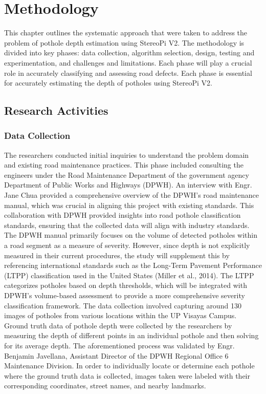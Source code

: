 \chapter{Methodology}
This chapter outlines the systematic approach that were taken to address the problem of pothole depth estimation using StereoPi V2. The methodology is divided into key phases: data collection, algorithm selection, design, testing and experimentation, and challenges and limitations. Each phase will play a crucial role in accurately classifying and assessing road defects.  Each phase is essential for accurately estimating the depth of potholes using StereoPi V2. 

\section{ Research Activities}

\subsection{Data Collection}
The researchers conducted initial inquiries to understand the problem domain and existing road maintenance practices. This phase included consulting the engineers under the Road Maintenance Department of the government agency Department of Public Works and Highways (DPWH). An interview with Engr. Jane Chua provided a comprehensive overview of the DPWH's road maintenance manual, which was crucial in aligning this project with existing standards. This collaboration with DPWH provided insights into road pothole classification standards, ensuring that the collected data will align with industry standards. The DPWH manual primarily focuses on the volume of detected potholes within a road segment as a measure of severity. However, since depth is not explicitly measured in their current procedures, the study will supplement this by referencing international standards such as the Long-Term Pavement Performance (LTPP) classification used in the United States (Miller et al., 2014). The LTPP categorizes potholes based on depth thresholds, which will be integrated with DPWH’s volume-based assessment to provide a more comprehensive severity classification framework. The data collection involved capturing around 130 images of potholes from various locations within the UP Visayas Campus. Ground truth data of pothole depth were collected by the researchers by measuring the depth of different points in an individual pothole and then solving for its average depth. The aforementioned process was validated by Engr. Benjamin Javellana, Assistant Director of the DPWH Regional Office 6 Maintenance Division. In order to individually locate or determine each pothole where the ground truth data is collected, images taken were labeled with their corresponding coordinates, street names, and nearby landmarks.

